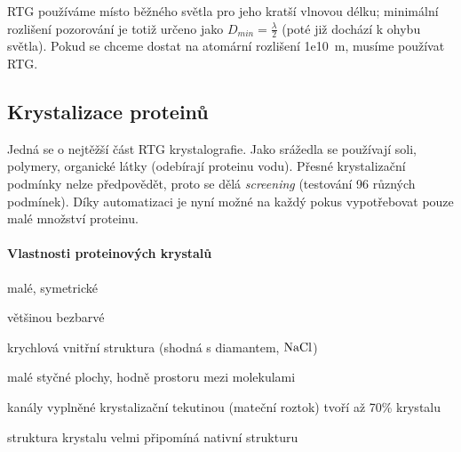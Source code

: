 \documentclass[DIV=8]{scrreprt}
\begin{document}
RTG používáme místo běžného světla pro jeho kratší vlnovou délku; minimální rozlišení pozorování je totiž určeno jako \(D_{min} = \frac{\lambda}{2}\) (poté již dochází k ohybu světla). Pokud se chceme dostat na atomární rozlišení \si{1e10 m}, musíme používat RTG.

\subsection{Krystalizace proteinů} \label{Krystalizace proteinů}


Jedná se o nejtěžší část RTG krystalografie. Jako srážedla se používají soli, polymery, organické látky (odebírají proteinu vodu). Přesné krystalizační podmínky nelze předpovědět, proto se dělá \emph{screening} (testování 96 různých podmínek). Díky automatizaci je nyní možné na každý pokus vypotřebovat pouze malé množství proteinu.

\paragraph{Vlastnosti proteinových krystalů}
\begin{myItemize}[nosep]
    \item malé, symetrické
    \item většinou bezbarvé
    \item krychlová vnitřní struktura (shodná s diamantem, \(\ce{NaCl}\))
    \item malé styčné plochy, hodně prostoru mezi molekulami
\begin{myItemize}[nosep]
    \item kanály vyplněné krystalizační tekutinou (mateční roz­tok) tvoří až 70\% krystalu
\end{myItemize}

    \item struktura krystalu velmi připomíná nativní strukturu
\end{myItemize}
\end{document}
